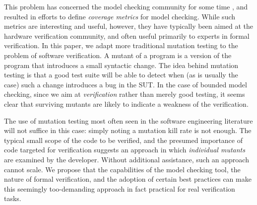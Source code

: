 \documentclass[conference]{IEEEtran}
\begin{document}
This problem has concerned the model checking community for some time
\cite{Hoskote,PracticalCov}, and resulted in efforts to define \emph{coverage
  metrics} for model checking.  While such metrics are interesting and
useful, however, they have typically been aimed at the hardware
verification community, and often useful primarily to experts in
formal verification.  In this paper, we adapt more traditional mutation
testing \cite{mutation1,mutation2} to the problem of software
verification.  A mutant of a program is a version of the program that
introduces a small syntactic change.  The idea behind mutation testing
is that a good test suite will be able to detect when (as is usually
the case) such a change introduces a bug in the SUT.  In the case of
bounded model checking, since we aim at \emph{verification} rather
than merely good testing, it seems clear that surviving mutants are
likely to indicate a weakness of the verification.

The use of mutation testing most often seen in the software
engineering literature will not suffice in this case: simply noting a
mutation kill rate is not enough.  The typical small scope of the code to be
verified, and the presumed importance of code targeted for verification suggests
an approach in which \emph{individual mutants} are examined by the
developer.  Without additional assistance, such an approach cannot
scale.  We propose that the capabilities of the model checking tool, the
nature of formal verification, and the adoption of certain best
practices can make this seemingly too-demanding approach in fact
practical for real verification tasks.

\end{document}
